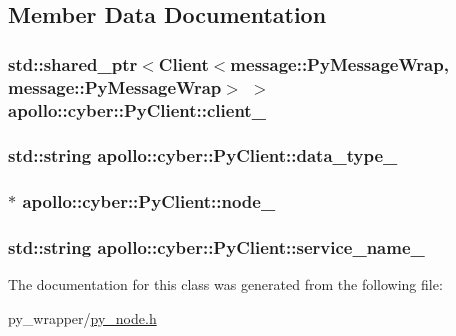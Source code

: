 \subsection{Member Data Documentation}
\hypertarget{classapollo_1_1cyber_1_1PyClient_a77642834603486811a27135ba0634481}{
\subsubsection[{client\-\_\-}]{\setlength{\rightskip}{0pt plus 5cm}std\-::shared\-\_\-ptr$<${\bf Client}$<${\bf message\-::\-Py\-Message\-Wrap}, {\bf message\-::\-Py\-Message\-Wrap}$>$ $>$ apollo\-::cyber\-::\-Py\-Client\-::client\-\_\-\hspace{0.3cm}{\ttfamily [private]}}}\label{classapollo_1_1cyber_1_1PyClient_a77642834603486811a27135ba0634481}
\hypertarget{classapollo_1_1cyber_1_1PyClient_a10b154765aeedf03563f23e8a341a91e}{
\subsubsection[{data\-\_\-type\-\_\-}]{\setlength{\rightskip}{0pt plus 5cm}std\-::string apollo\-::cyber\-::\-Py\-Client\-::data\-\_\-type\-\_\-\hspace{0.3cm}{\ttfamily [private]}}}\label{classapollo_1_1cyber_1_1PyClient_a10b154765aeedf03563f23e8a341a91e}
\hypertarget{classapollo_1_1cyber_1_1PyClient_a01dad8b3f92d223ae877dde18f1a8e78}{
\subsubsection[{node\-\_\-}]{$\ast$ apollo\-::cyber\-::\-Py\-Client\-::node\-\_\-\hspace{0.3cm}{\ttfamily [private]}}}\label{classapollo_1_1cyber_1_1PyClient_a01dad8b3f92d223ae877dde18f1a8e78}
\hypertarget{classapollo_1_1cyber_1_1PyClient_ab9e092b072bf453da77f0ef9d9a5aeea}{
\subsubsection[{service\-\_\-name\-\_\-}]{\setlength{\rightskip}{0pt plus 5cm}std\-::string apollo\-::cyber\-::\-Py\-Client\-::service\-\_\-name\-\_\-\hspace{0.3cm}{\ttfamily [private]}}}\label{classapollo_1_1cyber_1_1PyClient_ab9e092b072bf453da77f0ef9d9a5aeea}


The documentation for this class was generated from the following file\-:\begin{DoxyCompactItemize}
\item 
py\-\_\-wrapper/\hyperlink{py__node_8h}{py\-\_\-node.\-h}\end{DoxyCompactItemize}
